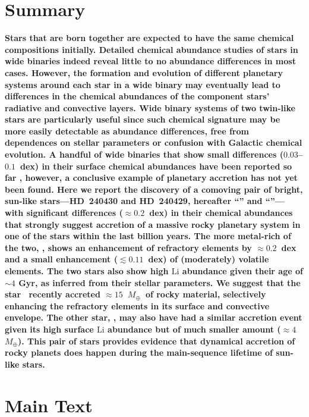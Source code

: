 \documentclass[12pt,letterpaper,margin=1in]{article}
\newcommand*\elem[1]{\ensuremath{\mathrm{#1}}}
\newcommand{\sunanalog}{\text{Krios}}
\newcommand{\bizarreone}{\text{Kronos}}
\newcommand{\mearth}{\ensuremath{M_\oplus}}
\begin{document}
\section{Summary}
{\bf \noindent
  Stars that are born together are expected to have the same chemical
  compositions initially.
  Detailed chemical abundance studies of stars in wide binaries indeed reveal
  little to no abundance differences in most
  cases\citep{Gratton:2001aa,Desidera:2004aa}.
  However, the formation and evolution of different planetary systems around
  each star in a wide binary may eventually lead to differences in the chemical
  abundances of the component stars' radiative and convective
  layers\cite{Pinsonneault:2001aa,Chambers:2010aa}.
  Wide binary systems of two twin-like stars are particularly useful since such
  chemical signature may be more easily detectable as abundance differences,
  free from dependences on stellar parameters or confusion with Galactic
  chemical evolution.
  A handful of wide binaries that show small differences ($0.03$--$0.1$~dex)
  in their surface chemical abundances have been reported so far
  \cite{Mack:2014aa,Mack:2016aa,Saffe:2015aa,Teske:2013aa,
    Teske:2015aa,Teske:2016aa,Teske:2016ab,Biazzo:2015aa,Ramirez:2015aa},
  however, a conclusive example of planetary accretion has not yet been found.
  Here we report the discovery of a comoving pair of bright, sun-like
  stars---HD~240430 and HD~240429, hereafter ``\bizarreone'' and
  ``\sunanalog''--- with significant differences ($\approx 0.2$~dex) in their
  chemical abundances that strongly suggest accretion of a massive rocky
  planetary system in one of the stars within the last billion years.
  The more metal-rich of the two, \bizarreone, shows an enhancement of refractory
  elements by $\approx 0.2$~dex and a small enhancement ($\lesssim 0.11$~dex) of
  (moderately) volatile elements.
  The two stars also show high \elem{Li} abundance given their age of $\sim 4$ Gyr,
  as inferred from their stellar parameters.
  We suggest that the star \bizarreone\ recently accreted
  $\approx 15$~\mearth\ of rocky material, selectively enhancing the
  refractory elements in its surface and convective envelope.
  The other star, \sunanalog, may also have had a similar accretion
  event given its high surface \elem{Li} abundance but of much smaller amount
  ($\approx 4$~\mearth).
  This pair of stars provides evidence that dynamical accretion of rocky planets
  does happen during the main-sequence lifetime of sun-like stars.
}

\section{Main Text}
\end{document}
